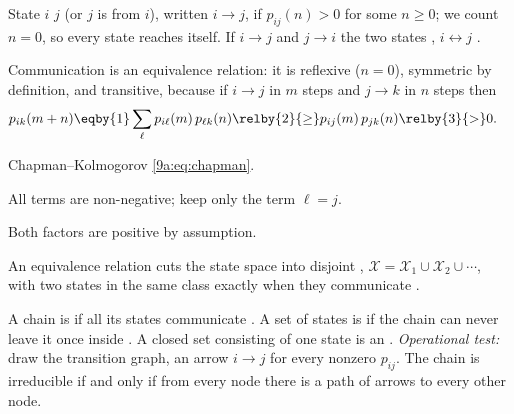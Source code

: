 State $i$  $j$ (or $j$ is  from $i$), written $i\to j$,
if $p_{ij}(n)>0$ for some $n\ge0$; we count $n=0$, so every state reaches itself. If $i\to j$
and $j\to i$ the two states , $i\leftrightarrow j$ .

Communication is an equivalence relation: it is reflexive ($n=0$), symmetric by definition,
and transitive, because if $i\to j$ in $m$ steps and $j\to k$ in $n$ steps then
\begin{align*}
  p_{ik}(m+n)
  &\eqby{1}\sum_\ell p_{i\ell}(m)\,p_{\ell k}(n)
  \relby{2}{\ge} p_{ij}(m)\,p_{jk}(n)
  \relby{3}{>}0 .
\end{align*}
\begin{explain}
  \item Chapman--Kolmogorov \eqref{9a:eq:chapman}.
  \item All terms are non-negative; keep only the term $\ell=j$.
  \item Both factors are positive by assumption.
\end{explain}
An equivalence relation cuts the state space into disjoint ,
$\mathcal X=\mathcal X_1\cup\mathcal X_2\cup\cdots$, with two states in the same class exactly
when they communicate .

\begin{workdef}
A chain is  if all its states communicate . A set of states is
 if the chain can never leave it once inside . A closed set consisting of one state is an
 .
\emph{Operational test:} draw the transition graph, an arrow $i\to j$ for every nonzero
$p_{ij}$. The chain is irreducible if and only if from every node there is a path of arrows to
every other node.
\end{workdef}

